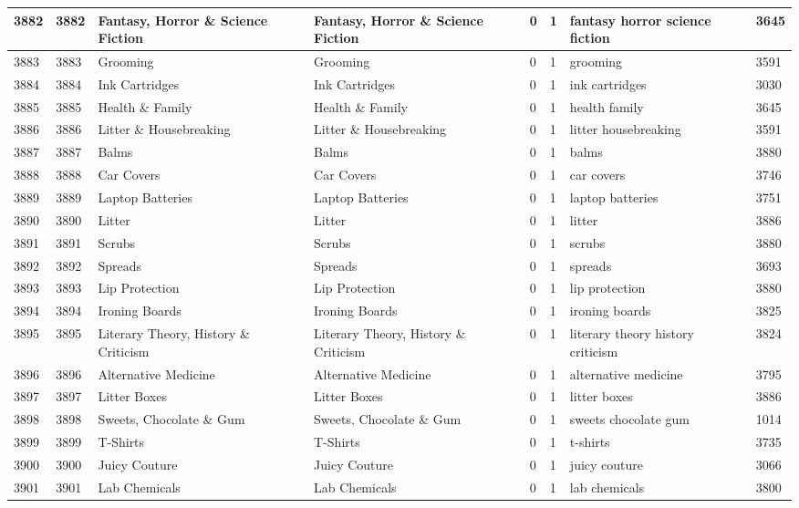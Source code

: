 \begin{longtable}{|l|l|l|l|l|l|l|l|}
3882 & 3882 & Fantasy, Horror \& Science Fiction & Fantasy, Horror \& Science Fiction & 0 & 1 & fantasy horror science fiction & 3645 \\ \hline 
3883 & 3883 & Grooming & Grooming & 0 & 1 & grooming & 3591 \\ \hline 
3884 & 3884 & Ink Cartridges & Ink Cartridges & 0 & 1 & ink cartridges & 3030 \\ \hline 
3885 & 3885 & Health \& Family & Health \& Family & 0 & 1 & health family & 3645 \\ \hline 
3886 & 3886 & Litter \& Housebreaking & Litter \& Housebreaking & 0 & 1 & litter housebreaking & 3591 \\ \hline 
3887 & 3887 & Balms & Balms & 0 & 1 & balms & 3880 \\ \hline 
3888 & 3888 & Car Covers & Car Covers & 0 & 1 & car covers & 3746 \\ \hline 
3889 & 3889 & Laptop Batteries & Laptop Batteries & 0 & 1 & laptop batteries & 3751 \\ \hline 
3890 & 3890 & Litter & Litter & 0 & 1 & litter & 3886 \\ \hline 
3891 & 3891 & Scrubs & Scrubs & 0 & 1 & scrubs & 3880 \\ \hline 
3892 & 3892 & Spreads & Spreads & 0 & 1 & spreads & 3693 \\ \hline 
3893 & 3893 & Lip Protection & Lip Protection & 0 & 1 & lip protection & 3880 \\ \hline 
3894 & 3894 & Ironing Boards & Ironing Boards & 0 & 1 & ironing boards & 3825 \\ \hline 
3895 & 3895 & Literary Theory, History \& Criticism & Literary Theory, History \& Criticism & 0 & 1 & literary theory history criticism & 3824 \\ \hline 
3896 & 3896 & Alternative Medicine & Alternative Medicine & 0 & 1 & alternative medicine & 3795 \\ \hline 
3897 & 3897 & Litter Boxes & Litter Boxes & 0 & 1 & litter boxes & 3886 \\ \hline 
3898 & 3898 & Sweets, Chocolate \& Gum & Sweets, Chocolate \& Gum & 0 & 1 & sweets chocolate gum & 1014 \\ \hline 
3899 & 3899 & T-Shirts & T-Shirts & 0 & 1 & t-shirts & 3735 \\ \hline 
3900 & 3900 & Juicy Couture & Juicy Couture & 0 & 1 & juicy couture & 3066 \\ \hline 
3901 & 3901 & Lab Chemicals & Lab Chemicals & 0 & 1 & lab chemicals & 3800 \\ \hline 

\end{longtable}
